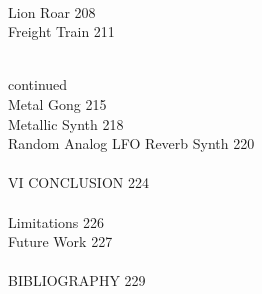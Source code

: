 \documentclass[12pt]{report} 	%
\numberwithin{figure}{chapter}
\numberwithin{table}{chapter}
\numberwithin{equation}{chapter}
\begin{document}
\\
\indent \indent \indent \indent \indent Lion Roar \hfill 208
\\
\indent \indent \indent \indent \indent Freight Train \hfill 211
\\
\\
\strut\hfill continued
\\
\indent \indent \indent \indent \indent Metal Gong \hfill 215
\\
\indent \indent \indent \indent \indent Metallic Synth \hfill 218
\\
\indent \indent \indent \indent \indent Random Analog LFO Reverb Synth \hfill 220
\\
\\
\indent \indent VI \hspace{6pt}  CONCLUSION \hfill 224
\\
\\
\indent \indent \indent \indent Limitations \hfill 226
\\
\indent \indent \indent \indent Future Work \hfill 227
\\
\\
BIBLIOGRAPHY \hfill 229
\clearpage
\end{document}

